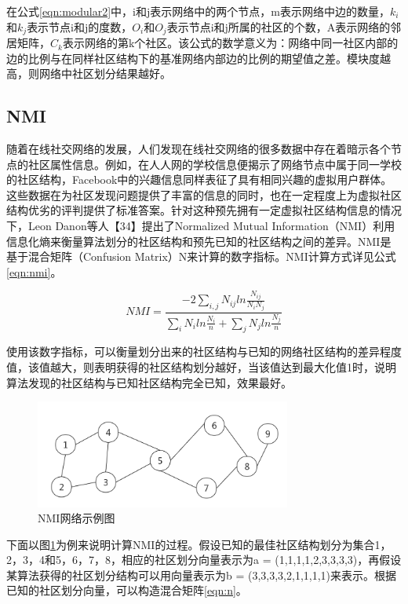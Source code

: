在公式\ref{eqn:modular2}中，i和j表示网络中的两个节点，m表示网络中边的数量，$k_i$和$k_j$表示节点i和j的度数，$O_i$和$O_j$表示节点i和j所属的社区的个数，A表示网络的邻居矩阵，$C_k$表示网络的第k个社区。该公式的数学意义为：网络中同一社区内部的边的比例与在同样社区结构下的基准网络内部边的比例的期望值之差。模块度越高，则网络中社区划分结果越好。

\subsection{NMI}
随着在线社交网络的发展，人们发现在线社交网络的很多数据中存在着暗示各个节点的社区属性信息。例如，在人人网的学校信息便揭示了网络节点中属于同一学校的社区结构，Facebook中的兴趣信息同样表征了具有相同兴趣的虚拟用户群体。这些数据在为社区发现问题提供了丰富的信息的同时，也在一定程度上为虚拟社区结构优劣的评判提供了标准答案。针对这种预先拥有一定虚拟社区结构信息的情况下，Leon Danon等人【34】提出了Normalized Mutual Information（NMI）利用信息化熵来衡量算法划分的社区结构和预先已知的社区结构之间的差异。NMI是基于混合矩阵（Confusion Matrix）N来计算的数字指标。NMI计算方式详见公式\ref{eqn:nmi}。

\begin{equation}
  \label{eqn:nmi}
  NMI=\frac{ -2 \sum_{i,j} N_{ij}  ln{\frac{N_{ij}}{N_iN_j}} } {\sum_{i}N_iln{\frac{N_i}{n}}+\sum_{j}N_jln{\frac{N_j}{n}}}
\end{equation}

使用该数字指标，可以衡量划分出来的社区结构与已知的网络社区结构的差异程度值，该值越大，则表明获得的社区结构划分越好，当该值达到最大化值1时，说明算法发现的社区结构与已知社区结构完全已知，效果最好。

\begin{figure}
 \centering
 \includegraphics[width=0.75\textwidth]{figures/fig5-1}
 \caption{NMI网络示例图}\label{fig:fig5-1}
\end{figure}

下面以图\ref{fig:fig5-1}为例来说明计算NMI的过程。假设已知的最佳社区结构划分为集合{1，2，3，4}和{5，6，7，8}，相应的社区划分向量表示为a = (1,1,1,1,2,3,3,3,3)，再假设某算法获得的社区划分结构可以用向量表示为b = (3,3,3,3,2,1,1,1,1)来表示。根据已知的社区划分向量，可以构造混合矩阵\ref{eqn:n}。

